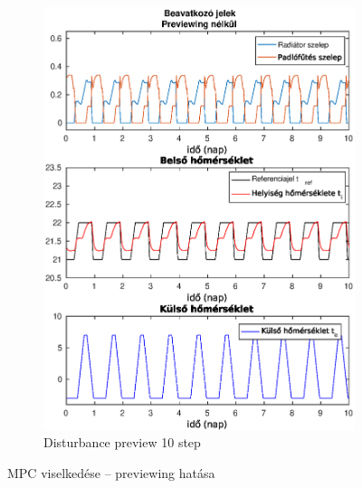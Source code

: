 \documentclass[14pt,handout]{beamer}
\begin{document}
\begin{frame}
\begin{figure}[H]
\begin{subfigure}[t]{0.47\textwidth}
		\includegraphics[trim=0 0 0 27, clip,width=\textwidth]{figures/onlab/compare/A_C_P0D10}
		\caption{\scriptsize Disturbance preview 10 step}
		\label{fig:mpc-pr0d10}
	\end{subfigure}
	\caption{MPC viselkedése -- previewing hatása}
	\label{fig:mpc-previeWeight}
\end{figure}
\end{frame}
\end{document}
